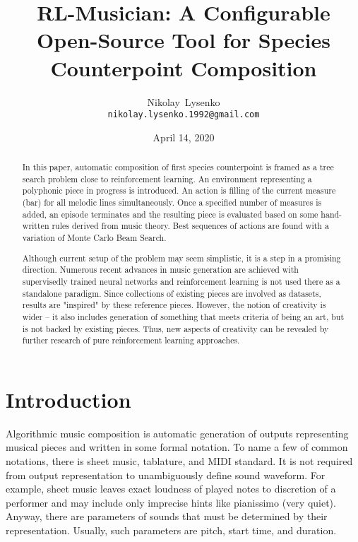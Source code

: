 \documentclass{article}
\title{RL-Musician: A Configurable Open-Source Tool for Species Counterpoint Composition}
\date{April 14, 2020}
\author{
  Nikolay~Lysenko\\
  \texttt{nikolay.lysenko.1992@gmail.com} \\
}
\begin{document}
\maketitle

\begin{abstract}
In this paper, automatic composition of first species counterpoint is framed as a tree search problem close to reinforcement learning. An environment representing a polyphonic piece in progress is introduced. An action is filling of the current measure (bar) for all melodic lines simultaneously. Once a specified number of measures is added, an episode terminates and the resulting piece is evaluated based on some hand-written rules derived from music theory. Best sequences of actions are found with a variation of Monte Carlo Beam Search.

Although current setup of the problem may seem simplistic, it is a step in a promising direction. Numerous recent advances in music generation are achieved with supervisedly trained neural networks and reinforcement learning is not used there as a standalone paradigm. Since collections of existing pieces are involved as datasets, results are "inspired" by these reference pieces. However, the notion of creativity is wider -- it also includes generation of something that meets criteria of being an art, but is not backed by existing pieces. Thus, new aspects of creativity can be revealed by further research of pure reinforcement learning approaches.
\end{abstract}



\section{Introduction}
\label{sec:introduction}

Algorithmic music composition is automatic generation of outputs representing musical pieces and written in some formal notation. To name a few of common notations, there is sheet music, tablature, and MIDI standard. It is not required from output representation to unambiguously define sound waveform. For example, sheet music leaves exact loudness of played notes to discretion of a performer and may include only imprecise hints like pianissimo (very quiet). Anyway, there are parameters of sounds that must be determined by their representation. Usually, such parameters are pitch, start time, and duration.
\end{document}
